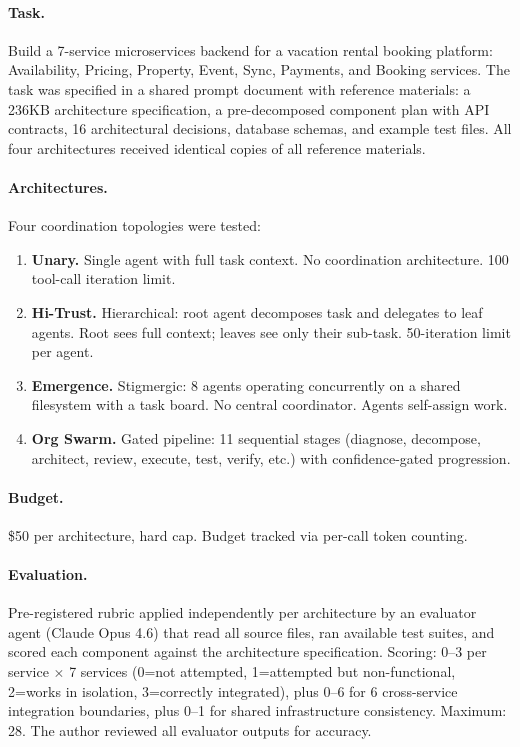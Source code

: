 \documentclass[11pt,a4paper]{article}
\begin{document}
\paragraph{Task.} Build a 7-service microservices backend for a vacation rental booking platform: Availability, Pricing, Property, Event, Sync, Payments, and Booking services. The task was specified in a shared prompt document with reference materials: a 236KB architecture specification, a pre-decomposed component plan with API contracts, 16 architectural decisions, database schemas, and example test files. All four architectures received identical copies of all reference materials.

\paragraph{Architectures.} Four coordination topologies were tested:

\begin{enumerate}
\item \textbf{Unary.} Single agent with full task context. No coordination architecture. 100 tool-call iteration limit.
\item \textbf{Hi-Trust.} Hierarchical: root agent decomposes task and delegates to leaf agents. Root sees full context; leaves see only their sub-task. 50-iteration limit per agent.
\item \textbf{Emergence.} Stigmergic: 8 agents operating concurrently on a shared filesystem with a task board. No central coordinator. Agents self-assign work.
\item \textbf{Org Swarm.} Gated pipeline: 11 sequential stages (diagnose, decompose, architect, review, execute, test, verify, etc.) with confidence-gated progression.
\end{enumerate}

\paragraph{Budget.} \$50 per architecture, hard cap. Budget tracked via per-call token counting.

\paragraph{Evaluation.} Pre-registered rubric applied independently per architecture by an evaluator agent (Claude Opus 4.6) that read all source files, ran available test suites, and scored each component against the architecture specification. Scoring: 0--3 per service $\times$ 7 services (0=not attempted, 1=attempted but non-functional, 2=works in isolation, 3=correctly integrated), plus 0--6 for 6 cross-service integration boundaries, plus 0--1 for shared infrastructure consistency. Maximum: 28. The author reviewed all evaluator outputs for accuracy.
\end{document}
